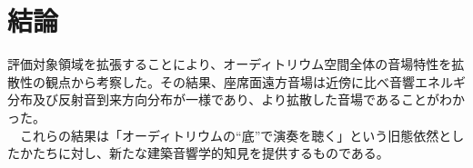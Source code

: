 \chapter{結論}
評価対象領域を拡張することにより、オーディトリウム空間全体の音場特性を拡散性の観点から考察した。その結果、座席面遠方音場は近傍に比べ音響エネルギ分布及び反射音到来方向分布が一様であり、より拡散した音場であることがわかった。
\\　これらの結果は「オーディトリウムの“底”で演奏を聴く」という旧態依然としたかたちに対し、新たな建築音響学的知見を提供するものである。